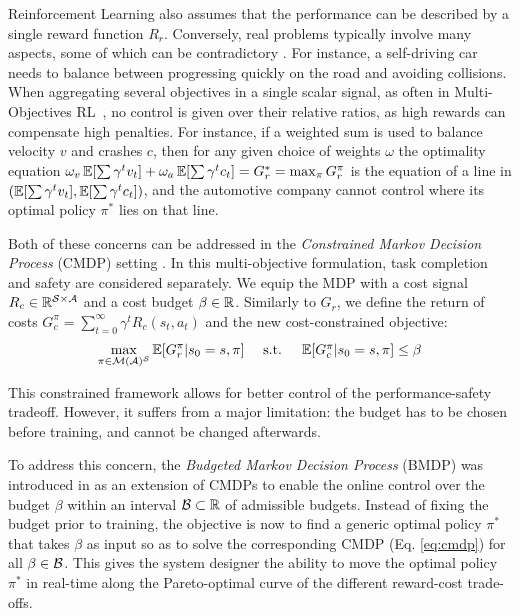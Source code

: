 \documentclass{article}
\begin{document}
Reinforcement Learning also assumes that the performance can be described by a single reward function $R_r$. Conversely, real problems typically involve many aspects, some of which can be contradictory \citep{Liu2014}. For instance, a self-driving car needs to balance between progressing quickly on the road and avoiding collisions. When aggregating several objectives in a single scalar signal, as often in Multi-Objectives RL~\citep{Roijers2013ASO}, no control is given over their relative ratios, as high rewards can compensate high penalties. For instance, if a weighted sum is used to balance velocity $v$ and crashes $c$, then for any given choice of weights $\omega$ the optimality equation $\omega_v\operatorname*{\mathbb{E}}[\sum\gamma^t v_t] + \omega_a\operatorname*{\mathbb{E}}[\sum\gamma^t c_t] = G_r^* = \max_\pi G^\pi_r$ is the equation of a line in $(\operatorname*{\mathbb{E}}[\sum\gamma^t v_t], \operatorname*{\mathbb{E}}[\sum\gamma^t c_t])$, and the automotive company cannot control where its optimal policy $\pi^*$ lies on that line.

Both of these concerns can be addressed in the \emph{Constrained Markov Decision Process} (CMDP) setting \citep{BEUTLER1985236,Altman95constrainedmarkov}. In this multi-objective formulation, task completion and safety are considered separately. We equip the MDP with a cost signal $R_c \in \mathbb{R}^{\mathcal{S}\times \mathcal{A}}$ and a cost budget $\beta\in\mathbb{R}$. Similarly to $G_r$, we define the return of costs $G_c^\pi = \sum_{t=0}^\infty \gamma^t R_c(s_t, a_t)$ and the new cost-constrained objective:
\begin{equation}
\label{eq:cmdp}
\begin{array}{lcr}
 \displaystyle \max_{\pi\in\mathcal{M}(\mathcal{A})^{\mathcal{S}}} \operatorname*{\mathbb{E}}[G_r^\pi | s_0=s, \pi] & \text{ s.t. } & \operatorname*{\mathbb{E}}[G_c^\pi | s_0=s, \pi] \leq \beta
\end{array}
\end{equation}

This constrained framework allows for better control of the performance-safety tradeoff. However, it suffers from a major limitation: the budget has to be chosen before training, and cannot be changed afterwards.

To address this concern, the \emph{Budgeted Markov Decision Process} (BMDP) was introduced in \citep{Boutilier_Lu:uai16} as an extension of CMDPs to enable the online control over the budget $\beta$ within an interval $\mathcal{B} \subset \mathbb{R}$ of admissible budgets. Instead of fixing the budget prior to training, the objective is now to find a generic optimal policy $\pi^*$ that takes $\beta$ as input so as to solve the corresponding CMDP (Eq. \eqref{eq:cmdp}) for all $\beta\in\mathcal{B}$. This gives the system designer the ability to move the optimal policy $\pi^*$ in real-time along the Pareto-optimal curve of the different reward-cost trade-offs.
\end{document}
